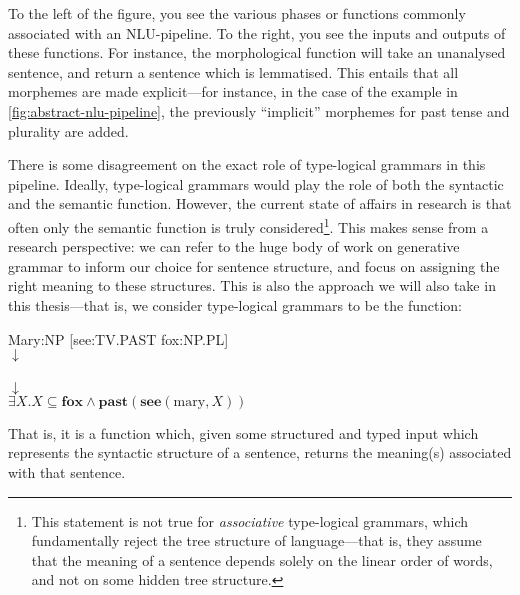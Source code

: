 To the left of the figure, you see the various phases or functions
commonly associated with an NLU-pipeline. To the right, you see the
inputs and outputs of these functions.
For instance, the morphological function will take an unanalysed
sentence, and return a sentence which is lemmatised. This entails that
all morphemes are made explicit---for instance, in the case of the
example in \autoref{fig:abstract-nlu-pipeline}, the previously
``implicit'' morphemes for past tense and plurality are added.

There is some disagreement on the exact role of type-logical grammars in
this pipeline. Ideally, type-logical grammars would play the role of
both the syntactic and the semantic function. However, the current
state of affairs in research is that often only the semantic function
is truly considered\footnote{%
  This statement is not true for \emph{associative} type-logical
  grammars, which fundamentally reject the tree structure of
  language---that is, they assume that the meaning of a sentence
  depends solely on the linear order of words, and not on some hidden
  tree structure.
}. This makes sense from a research perspective: we can refer to the
huge body of work on generative grammar to inform our choice for
sentence structure, and focus on assigning the right meaning to these
structures. This is also the approach we will also take in this
thesis---that is, we consider type-logical grammars to be the
function:
\begin{center}
  Mary:NP [see:TV.PAST fox:NP.PL]\\
  $\downarrow$\\
  \\
  $\downarrow$\\
  $\exists X.X\subseteq\mathbf{fox}\land\mathbf{past}(\mathbf{see}(\text{mary},X))$
\end{center}
That is, it is a function which, given some structured and typed input
which represents the syntactic structure of a sentence, returns the
meaning(s) associated with that sentence.

